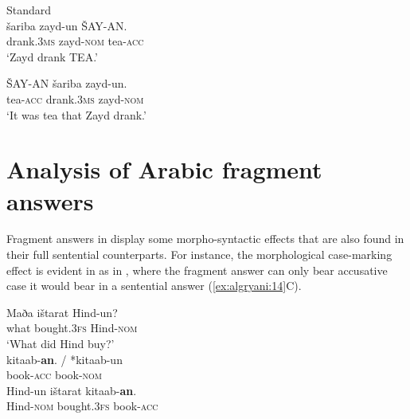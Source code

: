 \documentclass[output=paper]{LSP/langsci}
\begin{document}
\ea%
 \label{ex:algryani:13}

  Standard  \citep[202]{AounEtAl2010}\\
\ea
\gll šariba zayd-un ŠAY-AN.\\
 drank.\textsc{3ms} zayd-\textsc{nom} tea-\textsc{acc}\\
 \glt ‘Zayd drank TEA.’

 \ex
 \gll ŠAY-AN šariba zayd-un.\\
 tea-\textsc{acc} drank.\textsc{3ms} zayd-\textsc{nom} \\
 \glt ‘It was tea that Zayd drank.’
 \z
 \z


\section{Analysis of Arabic fragment answers}\label{sec:algryani:3}


Fragment answers in  display some morpho-syntactic effects that are also found in their full sentential counterparts. For instance, the morphological case-marking effect is evident in  as in , where the fragment answer can only bear accusative case it would bear in a sentential answer (\ref{ex:algryani:14}C).


\ea%
\label{ex:algryani:14}
\begin{xlist}[A:]
\gll Maða ištarat Hind-un?\\
 what bought.\textsc{3fs} Hind-\textsc{nom}\\
\glt  ‘What did Hind buy?’\\

\gll kitaab-\textbf{an}. / *kitaab-un\\
 book\textsc{-acc} {} book\textsc{-nom}\\

\gll Hind-un ištarat kitaab-\textbf{an}.\\
 Hind-\textsc{nom} bought.\textsc{3fs} book\textsc{-acc}\\
\end{xlist}
\z
\end{document}
